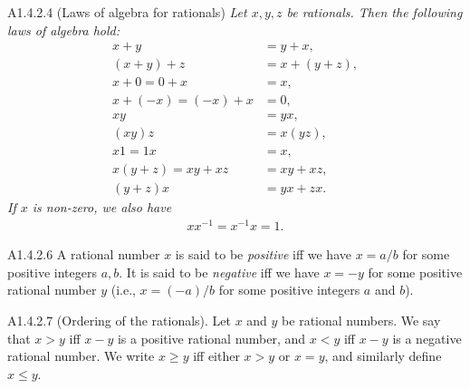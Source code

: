 \begin{proposition}{A1.4.2.4}
    (Laws of algebra for rationals) \emph{Let $x, y, z$ be rationals. Then the following laws of algebra hold:
    \begin{align*}
        x + y &= y + x,\\
        (x + y) + z &= x + (y + z),\\
        x + 0 = 0 + x &= x,\\
        x + (-x) = (-x) + x &= 0,\\
        xy &= yx,\\
        (xy)z &= x(yz),\\
        x1 = 1x &= x,\\
        x(y + z) = xy + xz &= xy + xz,\\
        (y + z)x &= yx + zx.
    \end{align*}
    If $x$ is non-zero, we also have
    \begin{align*}
        xx^{-1} = x^{-1}x = 1.
    \end{align*}
    }
\end{proposition}

\begin{definition}{A1.4.2.6}
    A rational number $x$ is said to be \emph{positive} iff we have $x = a/b$ for some positive integers $a, b$.
    It is said to be \emph{negative} iff we have $x = -y$ for some positive rational number $y$ (i.e., $x = (-a)/b$
    for some positive integers $a$ and $b$).
\end{definition}

\begin{lemma}{A1.4.2.7}
    (Ordering of the rationals). Let $x$ and $y$ be rational numbers. We say that $x > y$ iff $x - y$ is a positive
    rational number, and $x < y$ iff $x - y$ is a negative rational number. We write $x \geq y$ iff either $x > y$ or
    $x = y$, and similarly define $x \leq y$.
\end{lemma}


